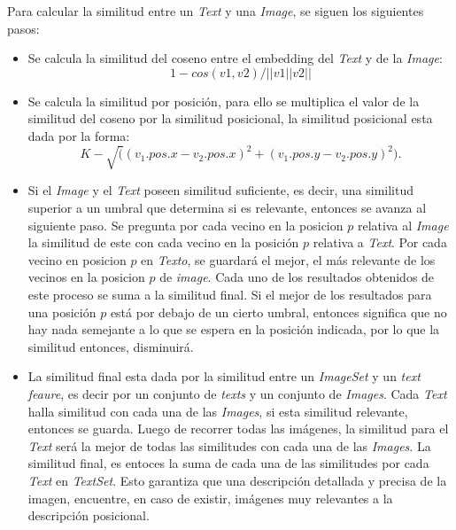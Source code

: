 Para calcular la similitud entre un \textit{Text} y una \textit{Image}, se siguen los siguientes pasos:
\begin{itemize}

    \item  Se calcula la similitud del coseno entre el embedding del \textit{Text} y de la \textit{Image}: 
    \[1- cos(v1,v2)/||v1||v2||\]

    \item  Se calcula la similitud por posici\'on, para ello se multiplica el valor de la similitud del coseno por la similitud posicional, la similitud posicional esta dada por la forma: 
    \[K- \sqrt((v_1.pos.x - v_2.pos.x)^2+(v_1.pos.y - v_2.pos.y)^2).\]

    \item Si el \textit{Image} y el \textit{Text} poseen similitud suficiente, es decir, una similitud superior a un umbral que determina si es relevante, entonces se avanza al siguiente paso. Se pregunta por cada vecino en la posicion $p$ relativa al \textit{Image} la similitud de este con cada vecino en la posición $p$ relativa a \textit{Text}. Por cada vecino en posicion $p$ en \textit{Texto}, se guardar\'a el mejor, el m\'as relevante de los vecinos en la posicion $p$ de \textit{image}. Cada uno de los resultados obtenidos de este proceso se suma a la similitud final. Si el mejor de los resultados para una posición $p$ está por debajo de un cierto umbral, entonces significa que no hay nada semejante a lo que se espera en la posición indicada, por lo que la similitud entonces, disminuirá.
    \item La similitud final esta dada por la similitud entre un \textit{ImageSet} y un \textit{text feaure}, es decir por un conjunto de \textit{texts} y un conjunto de \textit{Images}. Cada \textit{Text} halla similitud con cada una de las \textit{Images}, si esta similitud relevante, entonces se guarda. Luego de recorrer todas las im\'agenes, la similitud para el \textit{Text} ser\'a la mejor de todas las similitudes con cada una de las \textit{Images}. La similitud final, es entoces la suma de cada una de las similitudes por cada \textit{Text} en \textit{TextSet}. Esto garantiza que una descripci\'on detallada y precisa de la imagen, encuentre, en caso de existir, im\'agenes muy relevantes a la descripci\'on posicional.
\end{itemize}

